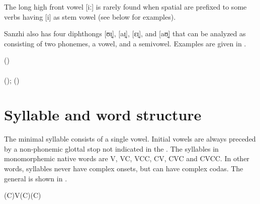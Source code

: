 The long high front vowel [iː] is rarely found when spatial  are prefixed to some verbs having [i] as stem vowel (see  below for examples).

Sanzhi also has four diphthongs [ʊɪ̯], [aɪ̯], [εɪ̯], and [aʊ̯] that can be analyzed as consisting of two phonemes, a vowel, and a semivowel. Examples are given in .
%
\begin{exe}
	\ex	\label{ex:diphthongs phon}
	\TabPositions{20em}
		  ()	\tab {} 	\\
		 		\tab  {} 	\\
		  ();  ()	
\end{exe}





\section{Syllable and word structure}
\label{sec:Syllable and word structure}

The minimal syllable consists of a single vowel. Initial vowels are always preceded by a non-phonemic glottal stop not indicated in the . The syllables in monomorphemic native words are V, VC, VCC, CV, CVC and CVCC. In other words, syllables never have complex onsets, but can have complex codas. The general  is shown in .
%
\begin{exe}
	\ex	(C)V(C)(C) \label{ex:syllable structure A phon}
\end{exe}

